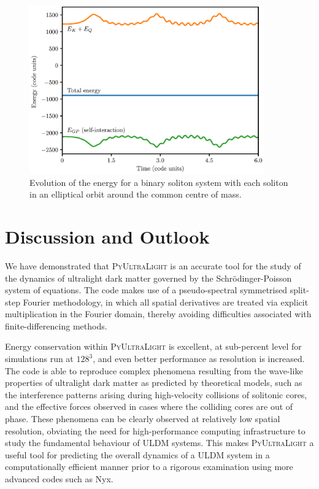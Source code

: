 \documentclass[a4paper,11pt]{article}
\newcommand{\PyUltraLight}{\textsc{PyUltraLight}\xspace}
\begin{document}
\begin{figure}
  \includegraphics[width=0.9\textwidth,trim=0 0 2cm 2cm,clip]{egy_m=22.eps}
  \caption{Evolution of the energy for a binary soliton system with each soliton in an elliptical orbit around the common centre of mass.}
  \label{fig:binary}
\end{figure}





\section{Discussion and Outlook}

We have demonstrated that \PyUltraLight is an accurate tool for the study of the dynamics of ultralight dark matter governed by the Schr{\"o}dinger-Poisson system of equations. The code makes use of a pseudo-spectral symmetrised split-step Fourier methodology, in which all spatial derivatives are treated via explicit multiplication in the Fourier domain, thereby avoiding difficulties associated with finite-differencing methods. 

Energy conservation within \PyUltraLight is excellent, at sub-percent level for simulations run at $128^3$, and even better performance as resolution is increased. The code is able to reproduce complex phenomena resulting from the wave-like properties of ultralight dark matter as predicted by theoretical models, such as the interference patterns arising during high-velocity collisions of solitonic cores, and the effective forces observed in cases where the colliding cores are out of phase. These phenomena can be clearly observed at relatively low spatial resolution, obviating the need for high-performance computing infrastructure to study the fundamental behaviour of ULDM systems. This makes \PyUltraLight a useful tool for predicting the overall dynamics of a ULDM system in a computationally efficient manner prior to a rigorous examination using more advanced codes such as Nyx.
\end{document}

